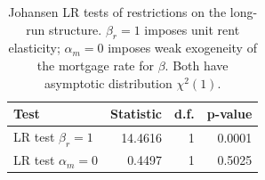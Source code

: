 \begin{table}[H]
\centering
\caption{Johansen LR tests of restrictions on the long-run structure. $\beta_r=1$ imposes unit rent elasticity; $\alpha_m=0$ imposes weak exogeneity of the mortgage rate for $\beta$. Both have asymptotic distribution $\chi^2(1)$.}
\label{tab:restriction_test}
\begin{tabular}{lrrr}
\toprule
Test & Statistic & d.f. & p-value \\
\midrule
LR test $\beta_r = 1$ & 14.4616 & 1 & 0.0001 \\
LR test $\alpha_m = 0$ & 0.4497 & 1 & 0.5025 \\
\bottomrule
\end{tabular}
\end{table}
